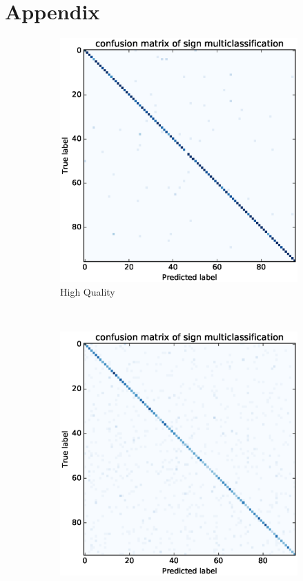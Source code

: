 \documentclass[twocolumn]{article}
\begin{document}
\section{Appendix}
\begin{figure}[h]
\centering
\begin{subfigure}[b]{0.48\linewidth}
        \includegraphics[trim=100 22 80 39, clip,width=1.0\linewidth]{results/logreg_high_quality_confusion}
        \caption{High Quality}
\end{subfigure}%
~
\begin{subfigure}[b]{0.48\linewidth}
        \includegraphics[trim=100 22 80 39, clip,width=1.0\linewidth]{results/logreg_low_quality_confusion}

\end{subfigure}
\end{figure}
\end{document}
